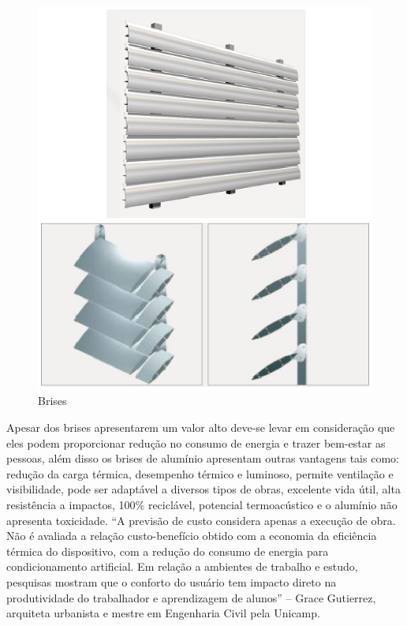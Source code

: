 \begin{figure}[!ht]
  \centering
  \includegraphics[keepaspectratio=true,scale=1]{figuras/brises.eps}
  \caption{Brises}
  \label{fig:brises}
\end{figure}

Apesar dos brises apresentarem um valor alto deve-se levar em consideração que eles podem proporcionar redução no consumo de energia e trazer bem-estar as pessoas, além disso os brises de alumínio apresentam outras vantagens tais como: redução da carga térmica, desempenho térmico e luminoso, permite ventilação e visibilidade, pode ser adaptável a diversos tipos de obras, excelente vida útil, alta resistência a impactos, 100\% reciclável, potencial termoacústico e o alumínio não apresenta toxicidade.  “A previsão de custo considera apenas a execução de obra. Não é avaliada a relação custo-benefício obtido com a economia da eficiência térmica do dispositivo, com a redução do consumo de energia para condicionamento artificial. Em relação a ambientes de trabalho e estudo, pesquisas mostram que o conforto do usuário tem impacto direto na produtividade do trabalhador e aprendizagem de alunos” – Grace Gutierrez, arquiteta urbanista e mestre em Engenharia Civil pela Unicamp. 

